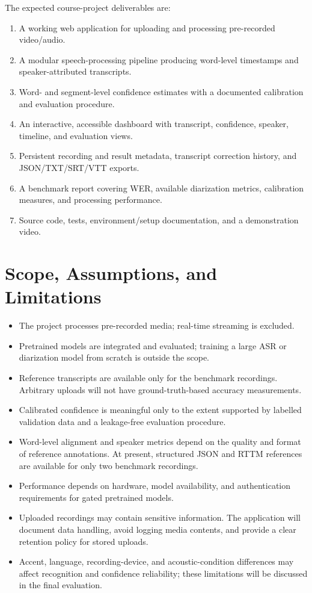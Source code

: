 \documentclass[11pt,a4paper]{article}
\begin{document}
The expected course-project deliverables are:
\begin{enumerate}
  \item A working web application for uploading and processing pre-recorded
  video/audio.
  \item A modular speech-processing pipeline producing word-level
  timestamps and speaker-attributed transcripts.
  \item Word- and segment-level confidence estimates with a documented
  calibration and evaluation procedure.
  \item An interactive, accessible dashboard with transcript, confidence,
  speaker, timeline, and evaluation views.
  \item Persistent recording and result metadata, transcript correction
  history, and JSON/TXT/SRT/VTT exports.
  \item A benchmark report covering WER, available diarization metrics,
  calibration measures, and processing performance.
  \item Source code, tests, environment/setup documentation, and a
  demonstration video.
\end{enumerate}

\section{Scope, Assumptions, and Limitations}

\begin{itemize}
  \item The project processes pre-recorded media; real-time streaming is
  excluded.
  \item Pretrained models are integrated and evaluated; training a large
  ASR or diarization model from scratch is outside the scope.
  \item Reference transcripts are available only for the benchmark
  recordings. Arbitrary uploads will not have ground-truth-based accuracy
  measurements.
  \item Calibrated confidence is meaningful only to the extent supported
  by labelled validation data and a leakage-free evaluation procedure.
  \item Word-level alignment and speaker metrics depend on the quality
  and format of reference annotations. At present, structured JSON and
  RTTM references are available for only two benchmark recordings.
  \item Performance depends on hardware, model availability, and
  authentication requirements for gated pretrained models.
  \item Uploaded recordings may contain sensitive information. The
  application will document data handling, avoid logging media contents,
  and provide a clear retention policy for stored uploads.
  \item Accent, language, recording-device, and acoustic-condition
  differences may affect recognition and confidence reliability; these
  limitations will be discussed in the final evaluation.
\end{itemize}
\end{document}
